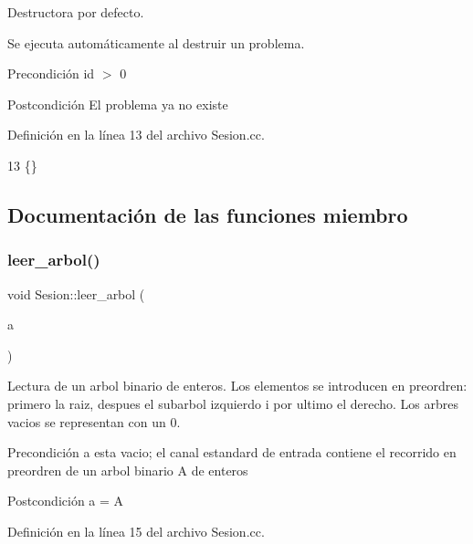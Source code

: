 Destructora por defecto. 

Se ejecuta automáticamente al destruir un problema. \begin{DoxyPrecond}{Precondición}
id $>$ 0 
\end{DoxyPrecond}
\begin{DoxyPostcond}{Postcondición}
El problema ya no existe 
\end{DoxyPostcond}


Definición en la línea 13 del archivo Sesion.\+cc.


\begin{DoxyCode}
13 \{\}
\end{DoxyCode}


\subsection{Documentación de las funciones miembro}
\mbox{\label{class_sesion_adea0f5f335e3eab364dfc59c28d790f3}} 
\subsubsection{\texorpdfstring{leer\+\_\+arbol()}{leer\_arbol()}}
{\footnotesize\ttfamily void Sesion\+::leer\+\_\+arbol (\begin{DoxyParamCaption}\item[{Bin\+Tree$<$ string $>$ \&}]{a }\end{DoxyParamCaption})\hspace{0.3cm}{\ttfamily [private]}}



Lectura de un arbol binario de enteros. Los elementos se introducen en preordren\+: primero la raiz, despues el subarbol izquierdo i por ultimo el derecho. Los arbres vacios se representan con un 0. 

\begin{DoxyPrecond}{Precondición}
a esta vacio; el canal estandard de entrada contiene el recorrido en preordren de un arbol binario A de enteros 
\end{DoxyPrecond}
\begin{DoxyPostcond}{Postcondición}
a = A 
\end{DoxyPostcond}


Definición en la línea 15 del archivo Sesion.\+cc.


